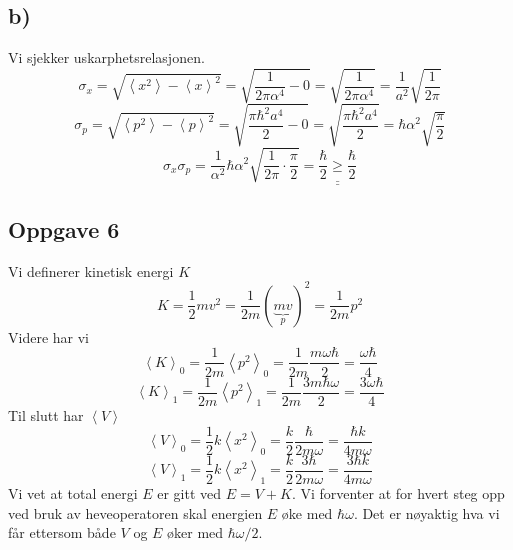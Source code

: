 \documentclass{article}
\begin{document}
\subsection*{b)}
Vi sjekker uskarphetsrelasjonen. 
\[
σ_x = \sqrt{\left<x^2\right> - \left<x\right>^2} = \sqrt{\frac{1}{2πα^4} - 0} = \sqrt{\frac{1}{2πα^4}} = \frac{1}{a^2} \sqrt{\frac{1}{2π}} 
\]
\[
σ_p = \sqrt{\left<p^2\right> - \left<p\right>^2} = \sqrt{\frac{πℏ^2a^{4}}{2} - 0} = \sqrt{\frac{πℏ^2a^{4}}{2}} = ℏα^2 \sqrt{\frac{π}{2}} 
\]
\[
σ_xσ_p = \frac{1}{α^2} ℏα^2 \sqrt{\frac{1}{2π} ⋅ \frac{π}{2}} = \underline{\underline{\frac{ℏ}{2} \ge \frac{ℏ}{2}}}
\]

\subsection*{Oppgave 6}
Vi definerer kinetisk energi $K$
\[
K = \frac{1}{2} mv^2 = \frac{1}{2m}(\underbrace{mv}_{p})^2 = \frac{1}{2m}p^2
\]
Videre har vi 
\[
\left<K\right>_{0} = \frac{1}{2m}\left<p^2\right>_{0} = \frac{1}{2m} \frac{mωℏ}{2} = \frac{ωℏ}{4}
\]
\[
\left<K\right>_{1} = \frac{1}{2m}\left<p^2\right>_{1} = \frac{1}{2m} \frac{3mℏω}{2} = \frac{3ωℏ}{4}
\]
Til slutt har $\left<V\right>$
\[
\left<V\right>_{0} = \frac{1}{2}k \left<x^2\right>_{0} = \frac{k}{2} \frac{ℏ}{2mω} = \frac{ℏk}{4mω}
\]
\[
\left<V\right>_{1} = \frac{1}{2}k \left<x^2\right>_{1} = \frac{k}{2} \frac{3ℏ}{2mω} = \frac{3ℏk}{4mω}
\]
Vi vet at total energi $E$ er gitt ved $E = V + K$. Vi forventer at for hvert steg opp ved bruk av heveoperatoren skal energien $E$ øke med $ℏω$. Det er nøyaktig hva vi får ettersom både $V$ og $E$ øker med $ℏω / 2$. 
\end{document}
